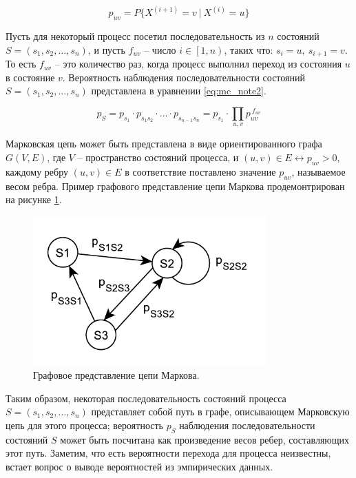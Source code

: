 \begin{equation}
	p_{uv}=P\{X^{\left(i+1\right)}=v\ \vert \ X^{\left(i\right)}=u\}
	\label{eq:mc_note1}
\end{equation}

Пусть для некоторый процесс посетил последовательность из $ n $ состояний $ S=\left(s_1,s_2,\ldots,s_n\right) $, и пусть $ f_{uv} $ -- число $ i\in\left[1,n\right) $, таких что: $ s_i=u,\ s_{i+1}=v $. То есть $ f_{uv} $ -- это количество раз, когда процесс выполнил переход из состояния $ u $ в состояние $ v $. Вероятность наблюдения последовательности состояний $ S=\left(s_1,s_2,\ldots,s_n\right) $ представлена в уравнении \ref{eq:mc_note2}.

\begin{equation}
	p_S=p_{s_1}\cdot p_{s_1s_2}\cdot\ldots\cdot p_{s_{n-1}s_n}=p_{s_1}\cdot\prod_{u,v} p_{uv}^{\ f_{uv}}
	\label{eq:mc_note2}
\end{equation}

Марковская цепь может быть представлена в виде ориентированного графа $ G\left(V,E\right) $, где $ V $ -- пространство состояний процесса, и $ \left(u,v\right)\in E\leftrightarrow p_{uv}>0 $, каждому ребру $ \left(u,v\right)\in E $ в соответствие поставлено значение $ p_{uv} $, называемое весом ребра. Пример графового представление цепи Маркова продемонтрирован на рисунке \ref{fig:mc_ex}.

\begin{figure}[htbp]
	\includegraphics[width=0.8\textwidth]{img/mc_ex.pdf}
	\caption{Графовое представление цепи Маркова.}
	\label{fig:mc_ex}
\end{figure}

Таким образом, некоторая последовательность состояний процесса $ S=\left(s_1,s_2,\ldots,s_n\right) $ представляет собой путь в графе, описывающем Марковскую цепь для этого процесса; вероятность $ p_S $ наблюдения последовательности состояний $ S $ может быть посчитана как произведение весов ребер, составляющих этот путь. Заметим, что есть вероятности перехода для процесса неизвестны, встает вопрос о выводе вероятностей из эмпирических данных.

